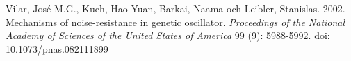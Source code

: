 \begin{thebibliography}{9}
	Vilar, José M.G., Kueh, Hao Yuan, Barkai, Naama och Leibler, Stanislas. 2002. Mechanisms of noise-resistance in genetic oscillator. \emph{Proceedings of the National Academy of Sciences of the United States of America} 99 (9): 5988-5992. doi: 10.1073/pnas.082111899 
\end{thebibliography}
	